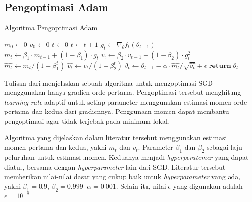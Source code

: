 \subsection{Pengoptimasi Adam}
\begin{algorithm}
  \linespread{1.5}
  \caption{Algoritma Pengoptimasi Adam}\label{Adam}
  \begin{algorithmic}[1]
      \State $m_0 \gets 0$ 
      \State $v_0 \gets 0$ 
      \State $t \gets 0$ 
        \State $t \gets t+1$
        \State $g_t \gets \nabla_\theta f_t (\theta_{t-1})$
        \State $m_t \gets \beta_1 \cdot m_{t-1} + (1 - \beta_1) \cdot g_t$ 
        \State $v_t \gets \beta_2 \cdot v_{t-1} + (1-\beta_2) \cdot g_t^2$ 
        \State $\hat{m_t} \gets m_t/(1-\beta_1^t)$ 
        \State $\hat{v_t} \gets v_t/(1-\beta_2^t)$ 
        \State $\theta_t \gets \theta_{t-1} - \alpha \cdot \hat{m_t}/\sqrt{\hat{v_t}}+\epsilon$
      \EndWhile
      \State \textbf{return} $\theta_t$ 
    \EndFunction
  \end{algorithmic}
\end{algorithm}

Tulisan dari \textcite{ADAMKingma} menjelaskan sebuah algoritma untuk mengoptimasi SGD menggunakan hanya gradien orde pertama. Pengoptimasi tersebut menghitung \emph{learning rate} adaptif untuk setiap parameter menggunakan estimasi momen orde pertama dan kedua dari gradiennya. Penggunaan momen dapat membantu pengoptimasi agar tidak terjebak pada minimum lokal.

Algoritma yang dijelaskan dalam literatur tersebut menggunakan estimasi momen pertama dan kedua, yakni $m_t$ dan $v_t$. Parameter $\beta_1$ dan $\beta_2$ sebagai laju peluruhan untuk estimasi momen. Keduanya menjadi \emph{hyperparatemer} yang dapat diatur, bersama dengan \emph{hyperparameter} lain dari SGD. Literatur tersebut memberikan nilai-nilai dasar yang cukup baik untuk \emph{hyperparameter} yang ada, yakni $\beta_1 = 0.9$, $\beta_2 = 0.999$, $\alpha = 0.001$. Selain itu, nilai $\epsilon$ yang digunakan adalah $\epsilon = 10^{-8}$

